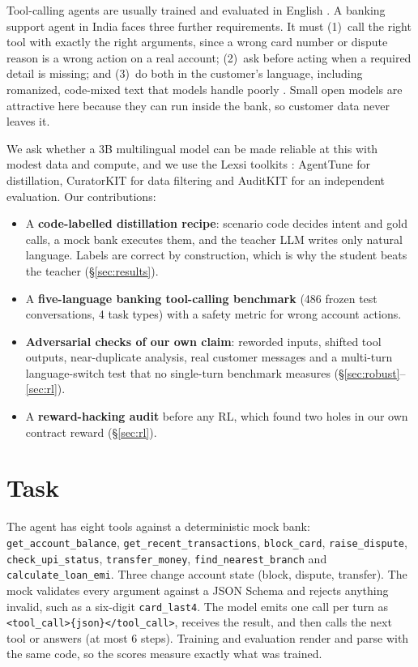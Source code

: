 \documentclass[11pt]{article}
\newcommand{\tool}[1]{\texttt{\small #1}}
\begin{document}
Tool-calling agents are usually trained and evaluated in English \citep{schick2023toolformer,patil2023gorilla,qin2024toolllm}.
A banking support agent in India faces three further requirements. It must (1)~call the right tool with exactly the
right arguments, since a wrong card number or dispute reason is a wrong action on a real account; (2)~ask before
acting when a required detail is missing; and (3)~do both in the customer's language, including romanized,
code-mixed text that models handle poorly \citep{khanuja2020gluecos}. Small open models are attractive here because
they can run inside the bank, so customer data never leaves it.

We ask whether a 3B multilingual model \citep{salamanca2026tinyaya,ustun2024aya} can be made reliable at this with modest data
and compute, and we use the Lexsi toolkits \citep{lexsi2026toolkits}: AgentTune \citep{lyngkhoi2026agenttune} for distillation,
CuratorKIT \citep{bhattacharjee2026curatorkit} for data filtering and AuditKIT \citep{arora2026auditkit} for an independent evaluation. Our contributions:

\begin{itemize}
\setlength\itemsep{0pt}
\item A \textbf{code-labelled distillation recipe}: scenario code decides intent and gold calls, a mock bank executes
them, and the teacher LLM writes only natural language. Labels are correct by construction, which is why the student
beats the teacher (\S\ref{sec:results}).
\item A \textbf{five-language banking tool-calling benchmark} (486 frozen test conversations, 4 task types) with a
safety metric for wrong account actions.
\item \textbf{Adversarial checks of our own claim}: reworded inputs, shifted tool outputs, near-duplicate analysis,
real customer messages and a multi-turn language-switch test that no single-turn benchmark measures (\S\ref{sec:robust}--\ref{sec:rl}).
\item A \textbf{reward-hacking audit} before any RL, which found two holes in our own contract reward (\S\ref{sec:rl}).
\end{itemize}

\section{Task}

The agent has eight tools against a deterministic mock bank: \tool{get\_account\_balance},
\tool{get\_recent\_transactions}, \tool{block\_card}, \tool{raise\_dispute}, \tool{check\_upi\_status},
\tool{transfer\_money}, \tool{find\_nearest\_branch} and \tool{calculate\_loan\_emi}. Three change account state (block,
dispute, transfer). The mock validates every argument against a JSON Schema and rejects anything invalid, such as a
six-digit \tool{card\_last4}. The model emits one call per turn as \tool{<tool\_call>\{json\}</tool\_call>}, receives the
result, and then calls the next tool or answers (at most 6 steps). Training and evaluation render and parse with the
same code, so the scores measure exactly what was trained.
\end{document}
